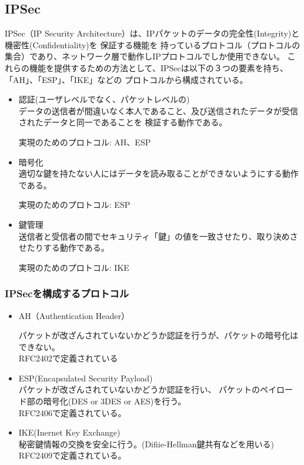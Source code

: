 \documentclass[11pt,a4j,titlepage]{jreport}
\begin{document}
\subsection{IPSec}
IPSec（IP Security Architecture）は、IPパケットのデータの完全性(Integrity)と機密性(Confidentiality)を
保証する機能を
持っているプロトコル（プロトコルの集合）であり、ネットワーク層で動作しIPプロトコルでしか使用できない。
これらの機能を提供するための方法として、IPSecは以下の３つの要素を持ち、「AH」、「ESP」、「IKE」などの
プロトコルから構成されている。
\begin{itemize}
    \item 認証(ユーザレベルでなく、パケットレベルの)\mbox{}\\
    データの送信者が間違いなく本人であること、及び送信されたデータが受信されたデータと同一であることを
    検証する動作である。\par
    実現のためのプロトコル: AH、ESP
    \item 暗号化\mbox{}\\
    適切な鍵を持たない人にはデータを読み取ることができないようにする動作である。\par
    実現のためのプロトコル: ESP
    \item 鍵管理\mbox{}\\
    送信者と受信者の間でセキュリティ「鍵」の値を一致させたり、取り決めさせたりする動作である。\par
    実現のためのプロトコル: IKE
\end{itemize}

\subsubsection{IPSecを構成するプロトコル}

\begin{itemize}
    \item AH（Authentication Header）\mbox{}\par
    パケットが改ざんされていないかどうか認証を行うが、パケットの暗号化はできない。\\RFC2402\cite{RFC2402}で定義されている

    \item ESP(Encapsulated Security Payload)\mbox{}\\
    パケットが改ざんされていないかどうか認証を行い、
    パケットのペイロード部の暗号化(DES or 3DES or AES)を行う。\\RFC2406\cite{RFC2406}で定義されている。 
    \item IKE(Inernet Key Exchange)\mbox{}\\
    秘密鍵情報の交換を安全に行う。(Difiie-Hellman鍵共有などを用いる)
    \\RFC2409\cite{RFC2409}で定義されている。
\end{itemize}
\end{document}
